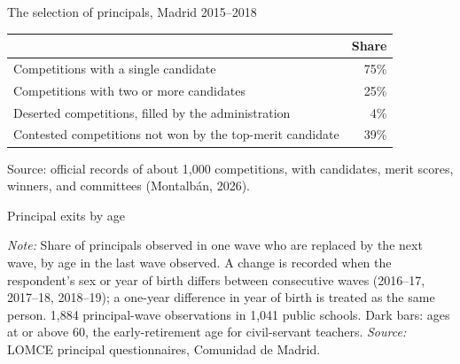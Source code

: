 \documentclass[aspectratio=169,11pt]{beamer}
\newcommand{\cit}[1]{{\color{cite}\small(#1)}}
\begin{document}
\begin{frame}{The selection of principals, Madrid 2015--2018}
\vspace{0.2cm}
\begin{center}
\renewcommand{\arraystretch}{1.25}\setlength{\tabcolsep}{10pt}
\begin{tabular}{lr}
\toprule
 & Share \\
\midrule
Competitions with a single candidate & 75\% \\
Competitions with two or more candidates & 25\% \\
Deserted competitions, filled by the administration & 4\% \\
Contested competitions not won by the top-merit candidate & 39\% \\
\bottomrule
\end{tabular}
\end{center}
\vspace{0.3cm}
{\small Source: official records of about 1,000 competitions, with candidates, merit scores, winners, and committees \cit{Montalb\'an, 2026}.}
\end{frame}

\begin{frame}{Principal exits by age}
\vspace{0.1cm}
\begin{center}
\end{center}
\vspace{-0.1cm}
{\scriptsize \textit{Note:} Share of principals observed in one wave who are replaced by the next wave, by age in the last wave observed. A change is recorded when the respondent's sex or year of birth differs between consecutive waves (2016--17, 2017--18, 2018--19); a one-year difference in year of birth is treated as the same person. 1,884 principal-wave observations in 1,041 public schools. Dark bars: ages at or above 60, the early-retirement age for civil-servant teachers. \textit{Source:} LOMCE principal questionnaires, Comunidad de Madrid.}
\end{frame}
\end{document}
